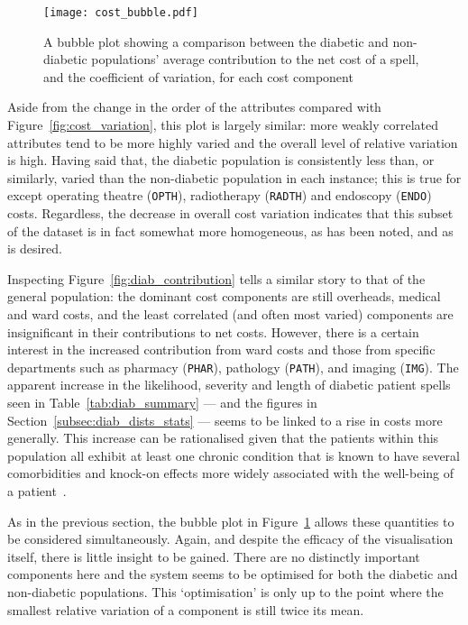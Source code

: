 \begin{figure}
    \centering
    \texttt{[image: cost\_bubble.pdf]}
    \caption{%
        A bubble plot showing a comparison between the diabetic and
        non-diabetic populations' average contribution to the net cost of a
        spell, and the coefficient of variation, for each cost component
    }\label{fig:diab_bubble}
\end{figure}

Aside from the change in the order of the attributes compared with
Figure~\ref{fig:cost_variation}, this plot is largely similar: more weakly
correlated attributes tend to be more highly varied and the overall level of
relative variation is high. Having said that, the diabetic population is
consistently less than, or similarly, varied than the non-diabetic population in
each instance; this is true for except operating theatre ({\tt OPTH}),
radiotherapy ({\tt RADTH}) and endoscopy ({\tt ENDO}) costs. Regardless, the
decrease in overall cost variation indicates that this subset of the dataset is
in fact somewhat more homogeneous, as has been noted, and as is desired.

Inspecting Figure~\ref{fig:diab_contribution} tells a similar story to that of
the general population: the dominant cost components are still overheads,
medical and ward costs, and the least correlated (and often most varied)
components are insignificant in their contributions to net costs. However, there
is a certain interest in the increased contribution from ward costs and those
from specific departments such as pharmacy ({\tt PHAR}), pathology ({\tt PATH}),
and imaging ({\tt IMG}). The apparent increase in the likelihood, severity and
length of diabetic patient spells seen in Table~\ref{tab:diab_summary} --- and
the figures in Section~\ref{subsec:diab_dists_stats} --- seems to be linked to a
rise in costs more generally. This increase can be rationalised given that the
patients within this population all exhibit at least one chronic condition that
is known to have several comorbidities and knock-on effects more widely
associated with the well-being of a
patient~\cite{Deschenes2015,Klimek2015,Walker2016}.

As in the previous section, the bubble plot in Figure~\ref{fig:diab_bubble}
allows these quantities to be considered simultaneously. Again, and despite the
efficacy of the visualisation itself, there is little insight to be gained.
There are no distinctly important components here and the system seems to be
optimised for both the diabetic and non-diabetic populations. This
`optimisation' is only up to the point where the smallest relative variation of
a component is still twice its mean.


